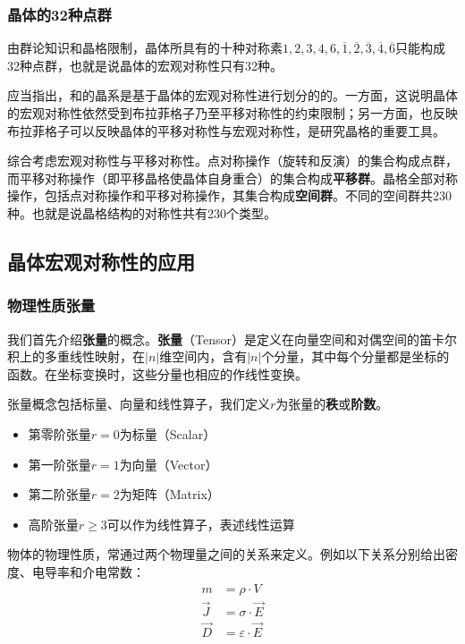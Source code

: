 \subsubsection{晶体的32种点群}
    由群论知识和晶格限制，晶体所具有的十种对称素$1,2,3,4,6,\overline{1},\overline{2},\overline{3},\overline{4},\overline{6}$只能构成32种点群，也就是说晶体的宏观对称性只有32种。
    
    应当指出，和的晶系是基于晶体的宏观对称性进行划分的的。一方面，这说明晶体的宏观对称性依然受到布拉菲格子乃至平移对称性的约束限制；另一方面，也反映布拉菲格子可以反映晶体的平移对称性与宏观对称性，是研究晶格的重要工具。

    综合考虑宏观对称性与平移对称性。点对称操作（旋转和反演）的集合构成点群，而平移对称操作（即平移晶格使晶体自身重合）的集合构成\textbf{平移群}。晶格全部对称操作，包括点对称操作和平移对称操作，其集合构成\textbf{空间群}。不同的空间群共230种。也就是说晶格结构的对称性共有230个类型。

\subsection{晶体宏观对称性的应用}
\subsubsection{物理性质张量}
    我们首先介绍\textbf{张量}的概念。\textbf{张量}（Tensor）是定义在向量空间和对偶空间的笛卡尔积上的多重线性映射，在$|n|$维空间内，含有$|n|$个分量，其中每个分量都是坐标的函数。在坐标变换时，这些分量也相应的作线性变换。

    张量概念包括标量、向量和线性算子，我们定义$r$为张量的\textbf{秩}或\textbf{阶数}。
    \begin{itemize}[itemsep=0pt,parsep=0pt]
        \item 第零阶张量$r = 0$为标量（Scalar）
        \item 第一阶张量$r = 1$为向量（Vector）
        \item 第二阶张量$r = 2$为矩阵（Matrix）
        \item 高阶张量$r \geq 3$可以作为线性算子，表述线性运算
    \end{itemize}

    物体的物理性质，常通过两个物理量之间的关系来定义。例如以下关系分别给出密度、电导率和介电常数：
    \begin{align*}
        m &= \rho \cdot V\\
        \vec{J} &= \sigma \cdot \vec{E}\\
        \vec{D} &= \varepsilon \cdot \vec{E}\\
    \end{align*}

